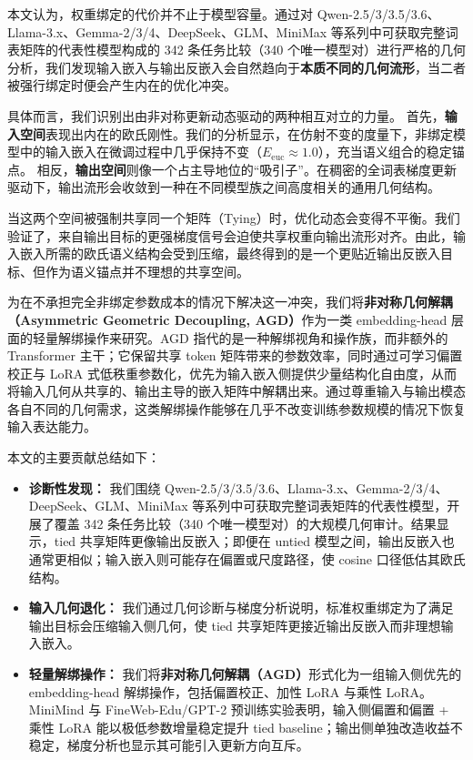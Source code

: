 \documentclass{article}
\theoremstyle{plain}
\theoremstyle{definition}
\theoremstyle{remark}
\begin{document}
本文认为，权重绑定的代价并不止于模型容量。通过对 Qwen-2.5/3/3.5/3.6、Llama-3.x、Gemma-2/3/4、DeepSeek、GLM、MiniMax 等系列中可获取完整词表矩阵的代表性模型构成的 342 条任务比较（340 个唯一模型对）进行严格的几何分析，我们发现输入嵌入与输出反嵌入会自然趋向于\textbf{本质不同的几何流形}，当二者被强行绑定时便会产生内在的优化冲突。

具体而言，我们识别出由非对称更新动态驱动的两种相互对立的力量。
首先，\textbf{输入空间}表现出内在的欧氏刚性。我们的分析显示，在仿射不变的度量下，非绑定模型中的输入嵌入在微调过程中几乎保持不变（$E_{\mathrm{euc}} \approx 1.0$），充当语义组合的稳定锚点。
相反，\textbf{输出空间}则像一个占主导地位的“吸引子”。在稠密的全词表梯度更新驱动下，输出流形会收敛到一种在不同模型族之间高度相关的通用几何结构。

当这两个空间被强制共享同一个矩阵（Tying）时，优化动态会变得不平衡。我们验证了，来自输出目标的更强梯度信号会迫使共享权重向输出流形对齐。由此，输入嵌入所需的欧氏语义结构会受到压缩，最终得到的是一个更贴近输出反嵌入目标、但作为语义锚点并不理想的共享空间。

为在不承担完全非绑定参数成本的情况下解决这一冲突，我们将\textbf{非对称几何解耦（Asymmetric Geometric Decoupling, AGD）}作为一类 embedding-head 层面的轻量解绑操作来研究。AGD 指代的是一种解绑视角和操作族，而非额外的 Transformer 主干；它保留共享 token 矩阵带来的参数效率，同时通过可学习偏置校正与 LoRA 式低秩重参数化，优先为输入嵌入侧提供少量结构化自由度，从而将输入几何从共享的、输出主导的嵌入矩阵中解耦出来。通过尊重输入与输出模态各自不同的几何需求，这类解绑操作能够在几乎不改变训练参数规模的情况下恢复输入表达能力。

本文的主要贡献总结如下：
\begin{itemize}
    \item \textbf{诊断性发现：} 我们围绕 Qwen-2.5/3/3.5/3.6、Llama-3.x、Gemma-2/3/4、DeepSeek、GLM、MiniMax 等系列中可获取完整词表矩阵的代表性模型，开展了覆盖 342 条任务比较（340 个唯一模型对）的大规模几何审计。结果显示，tied 共享矩阵更像输出反嵌入；即便在 untied 模型之间，输出反嵌入也通常更相似；输入嵌入则可能存在偏置或尺度路径，使 cosine 口径低估其欧氏结构。
    \item \textbf{输入几何退化：} 我们通过几何诊断与梯度分析说明，标准权重绑定为了满足输出目标会压缩输入侧几何，使 tied 共享矩阵更接近输出反嵌入而非理想输入嵌入。
    \item \textbf{轻量解绑操作：} 我们将\textbf{非对称几何解耦（AGD）}形式化为一组输入侧优先的 embedding-head 解绑操作，包括偏置校正、加性 LoRA 与乘性 LoRA。MiniMind 与 FineWeb-Edu/GPT-2 预训练实验表明，输入侧偏置和偏置 + 乘性 LoRA 能以极低参数增量稳定提升 tied baseline；输出侧单独改造收益不稳定，梯度分析也显示其可能引入更新方向互斥。
\end{itemize}
\end{document}
